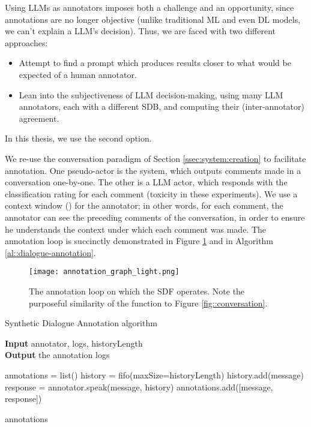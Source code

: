 Using LLMs as annotators imposes both a challenge and an opportunity, since annotations are no longer objective (unlike traditional \ac{ML} and even \ac{DL} models, we can't explain a LLM's decision). Thus, we are faced with two different approaches:

\begin{itemize}
	\item Attempt to find a prompt which produces results closer to what would be expected of a human annotator.
	\item Lean into the subjectiveness of LLM decision-making, using many LLM annotators, each with a different \ac{SDB}, and computing their (inter-annotator) agreement.
\end{itemize}

In this thesis, we use the second option.

We re-use the conversation paradigm of Section \ref{ssec:system:creation} to facilitate annotation. One pseudo-actor is the system, which outputs comments made in a conversation one-by-one. The other is a LLM actor, which responds with the classification rating for each comment (toxicity in these experiments).  We use a context window  () for the annotator; in other words, for each comment, the annotator can see the  preceding comments of the conversation, in order to ensure he understands the context under which each comment was made. The annotation loop is succinctly demonstrated in Figure \ref{fig::annotation} and in Algorithm \ref{al::dialogue-annotation}.

\begin{figure}
	\centering
	\texttt{[image: annotation\_graph\_light.png]}
	\caption{The annotation loop on which the \ac{SDF} operates. Note the purposeful similarity of the function to Figure \ref{fig::conversation}.}
	\label{fig::annotation}
\end{figure}

\begin{algorithm}
	\caption{Synthetic Dialogue Annotation algorithm} 
	\label{al::dialogue-annotation}
	\hspace*{\algorithmicindent} \textbf{Input} annotator, logs, historyLength\\
	\hspace*{\algorithmicindent} \textbf{Output} the annotation logs
	\begin{algorithmic}[1]	
		\State annotations = list()
		\State history = fifo(maxSize=historyLength)
		\State 
		\State history.add(message)
		\State response = annotator.speak(message, history)
		\State annotations.add([message, response])
		\EndFor
		
		\State \Return annotations
	\end{algorithmic} 
\end{algorithm}


